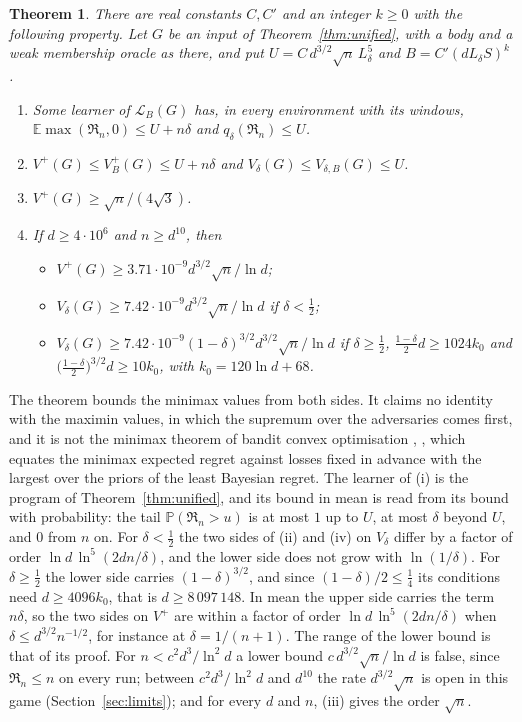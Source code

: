 \documentclass[11pt]{amsart}
\newtheorem{theorem}{Theorem}[section]
\theoremstyle{definition}
\numberwithin{equation}{section}
\newcommand{\E}{\mathbb{E}}
\newcommand{\Prob}{\mathbb{P}}
\newcommand{\Reg}{\mathfrak{R}}
\begin{document}
\begin{theorem}\label{thm:mm}
There are real constants $C,C'$ and an integer $k\ge0$ with the following property. Let $G$ be an input of Theorem~\ref{thm:unified}, with a body and a weak membership oracle as there, and put $U=C\,d^{3/2}\sqrt n\,L_\delta^5$ and $B=C'(dL_\delta S)^k$.
\begin{enumerate}[label=(\roman*)]
\item Some learner of $\mathcal L_B(G)$ has, in every environment with its windows, $\E\max(\Reg_n,0)\le U+n\delta$ and $q_\delta(\Reg_n)\le U$.
\item $V^+(G)\le V^+_B(G)\le U+n\delta$ and $V_\delta(G)\le V_{\delta,B}(G)\le U$.
\item $V^+(G)\ge\sqrt n/(4\sqrt3)$.
\item If $d\ge4\cdot10^6$ and $n\ge d^{10}$, then
\begin{itemize}[leftmargin=*]
\item $V^+(G)\ge3.71\cdot10^{-9}d^{3/2}\sqrt n/\ln d$;
\item $V_\delta(G)\ge7.42\cdot10^{-9}d^{3/2}\sqrt n/\ln d$ if $\delta<\frac12$;
\item $V_\delta(G)\ge7.42\cdot10^{-9}(1-\delta)^{3/2}d^{3/2}\sqrt n/\ln d$ if $\delta\ge\frac12$, $\frac{1-\delta}2d\ge1024k_0$ and $\bigl(\frac{1-\delta}2\bigr)^{3/2}d\ge10k_0$, with $k_0=120\ln d+68$.
\end{itemize}
\end{enumerate}
\end{theorem}

The theorem bounds the minimax values from both sides. It claims no identity with the maximin values, in which the supremum over the adversaries comes first, and it is not the minimax theorem of bandit convex optimisation \cite{BDKP15}, \cite[Section~8.6 and Theorem~8.17]{Lat24}, which equates the minimax expected regret against losses fixed in advance with the largest over the priors of the least Bayesian regret. The learner of (i) is the program of Theorem~\ref{thm:unified}, and its bound in mean is read from its bound with probability: the tail $\Prob(\Reg_n>u)$ is at most $1$ up to $U$, at most $\delta$ beyond $U$, and $0$ from $n$ on. For $\delta<\frac12$ the two sides of (ii) and (iv) on $V_\delta$ differ by a factor of order $\ln d\,\ln^5(2dn/\delta)$, and the lower side does not grow with $\ln(1/\delta)$. For $\delta\ge\frac12$ the lower side carries $(1-\delta)^{3/2}$, and since $(1-\delta)/2\le\frac14$ its conditions need $d\ge4096k_0$, that is $d\ge8\,097\,148$. In mean the upper side carries the term $n\delta$, so the two sides on $V^+$ are within a factor of order $\ln d\,\ln^5(2dn/\delta)$ when $\delta\le d^{3/2}n^{-1/2}$, for instance at $\delta=1/(n+1)$. The range of the lower bound is that of its proof. For $n<c^2d^3/\ln^2d$ a lower bound $c\,d^{3/2}\sqrt n/\ln d$ is false, since $\Reg_n\le n$ on every run; between $c^2d^3/\ln^2d$ and $d^{10}$ the rate $d^{3/2}\sqrt n$ is open in this game (Section~\ref{sec:limits}); and for every $d$ and $n$, (iii) gives the order $\sqrt n$.
\end{document}
